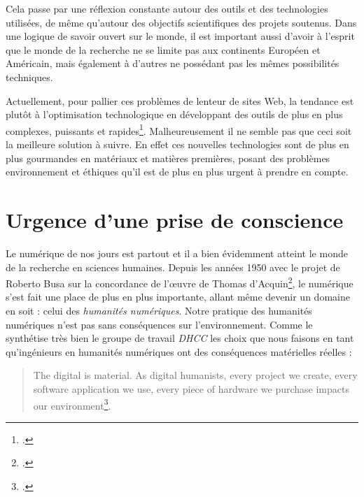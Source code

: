 \documentclass[a4paper,12pt,twoside]{book}
\begin{document}
Cela passe par une réflexion constante autour des outils et des technologies utilisées, de même qu'autour des objectifs scientifiques des projets soutenus. Dans une logique de savoir ouvert sur le monde, il est important aussi d'avoir à l'esprit que le monde de la recherche ne se limite pas aux continents Européen et Américain, mais également à d'autres ne possédant pas les mêmes possibilités techniques.

Actuellement, pour pallier ces problèmes de lenteur de sites Web, la tendance est plutôt à l'optimisation technologique en développant des outils de plus en plus complexes, puissants et rapides\footcite{sixg}. Malheureusement il ne semble pas que ceci soit la meilleure solution à suivre. En effet ces nouvelles technologies sont de plus en plus gourmandes en matériaux et matières premières, posant des problèmes environnement et éthiques qu'il est de plus en plus urgent à prendre en compte.


\section{Urgence d'une prise de conscience}
Le numérique de nos jours est partout et il a bien évidemment atteint le monde de la recherche en sciences humaines. Depuis les années 1950 avec le projet de Roberto Busa sur la concordance de l'\oe{}uvre de Thomas d'Acquin\footcite{kinsella_review_1997}, le numérique s'est fait une place de plus en plus importante, allant même devenir un domaine en soit : celui des \textit{humanités numériques}.
Notre pratique des humanités numériques n'est pas sans conséquences sur l'environnement. Comme le synthétise très bien le groupe de travail \textit{\acrfull{DHCC}} les choix que nous faisons en tant qu'ingénieurs en humanités numériques ont des conséquences matérielles réelles :

\begin{otherlanguage}{english}
\begin{quote}
    The digital is material. As digital humanists, every project we create, every software application we use, every piece of hardware we purchase impacts our environment\footcite{DHCC}.
\end{quote}
\end{otherlanguage}
\end{document}
